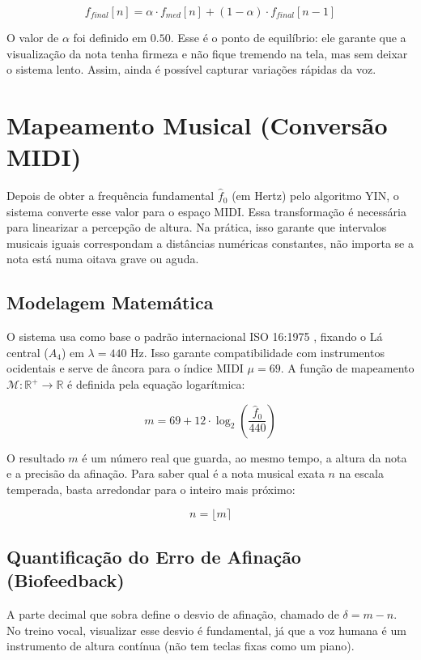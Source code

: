 \documentclass[11pt, a4paper]{article}
\theoremstyle{plain}
\theoremstyle{definition}
\begin{document}
\begin{equation}
    f_{final}[n] = \alpha \cdot f_{med}[n] + (1 - \alpha) \cdot f_{final}[n-1]
\end{equation}

O valor de $\alpha$ foi definido em $0.50$. Esse é o ponto de equilíbrio: ele garante que a visualização da nota tenha firmeza e não fique tremendo na tela, mas sem deixar o sistema lento. Assim, ainda é possível capturar variações rápidas da voz.

\section{Mapeamento Musical (Conversão MIDI)}

Depois de obter a frequência fundamental $\hat{f}_0$ (em Hertz) pelo algoritmo YIN, o sistema converte esse valor para o espaço MIDI. Essa transformação é necessária para linearizar a percepção de altura. Na prática, isso garante que intervalos musicais iguais correspondam a distâncias numéricas constantes, não importa se a nota está numa oitava grave ou aguda.

\subsection{Modelagem Matemática}
O sistema usa como base o padrão internacional ISO 16:1975 \cite{iso16}, fixando o Lá central ($A_4$) em $\lambda = 440$ Hz. Isso garante compatibilidade com instrumentos ocidentais e serve de âncora para o índice MIDI $\mu = 69$. A função de mapeamento $\mathcal{M}: \mathbb{R}^+ \to \mathbb{R}$ é definida pela equação logarítmica:

\begin{equation}
    m = 69 + 12 \cdot \log_2 \left( \frac{\hat{f}_0}{440} \right)
\end{equation}

O resultado $m$ é um número real que guarda, ao mesmo tempo, a altura da nota e a precisão da afinação. Para saber qual é a nota musical exata $n$ na escala temperada, basta arredondar para o inteiro mais próximo:

\begin{equation}
    n = \lfloor m \rceil
\end{equation}

\subsection{Quantificação do Erro de Afinação (Biofeedback)}
A parte decimal que sobra define o desvio de afinação, chamado de $\delta = m - n$. No treino vocal, visualizar esse desvio é fundamental, já que a voz humana é um instrumento de altura contínua (não tem teclas fixas como um piano).
\end{document}
